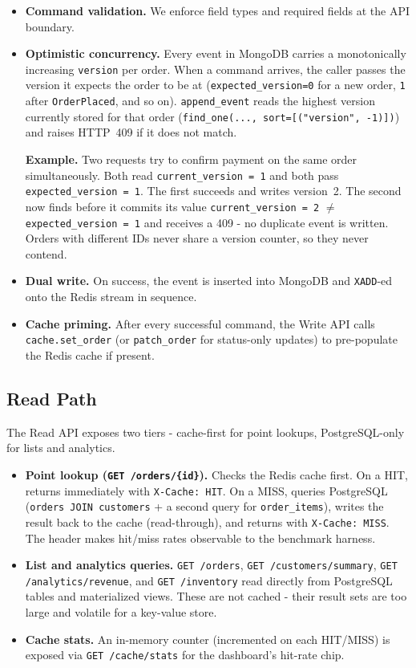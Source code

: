 \documentclass[11pt,a4paper]{article}
\newcommand{\code}[1]{\texttt{\small #1}}
\begin{document}
\begin{itemize}
  \item \textbf{Command validation.} We enforce field types and required fields at the API boundary.
\item \textbf{Optimistic concurrency.}
Every event in MongoDB carries a monotonically increasing \code{version} per order.
When a command arrives, the caller passes the version it expects the order to be at
(\code{expected\_version=0} for a new order, \code{1} after \code{OrderPlaced}, and
so on).
\code{append\_event} reads the highest version currently stored for that order
(\code{find\_one(..., sort=[("version", -1)])}) and raises HTTP~409 if it does not
match.

\textbf{Example.} Two requests try to confirm payment on the same order simultaneously.
Both read \code{current\_version = 1} and both pass \code{expected\_version = 1}.
The first succeeds and writes version~2.
The second now finds before it commits its value \code{current\_version = 2} $\neq$ \code{expected\_version = 1}
and receives a 409 - no duplicate event is written.
Orders with different IDs never share a version counter, so they never contend.

  \item \textbf{Dual write.} On success, the event is inserted into MongoDB and \code{XADD}-ed onto the Redis stream in sequence.
  \item \textbf{Cache priming.} After every successful command, the Write API calls \code{cache.set\_order} (or \code{patch\_order} for status-only updates) to pre-populate the Redis cache if present.
\end{itemize}

\subsection{Read Path}

The Read API exposes two tiers - cache-first for point lookups, PostgreSQL-only for lists and analytics.

\begin{itemize}
  \item \textbf{Point lookup (\code{GET /orders/\{id\}}).} Checks the Redis cache first. On a HIT, returns immediately with \code{X-Cache: HIT}. On a MISS, queries PostgreSQL (\code{orders JOIN customers} + a second query for \code{order\_items}), writes the result back to the cache (read-through), and returns with \code{X-Cache: MISS}. The header makes hit/miss rates observable to the benchmark harness.
  \item \textbf{List and analytics queries.} \code{GET /orders}, \code{GET /customers/summary}, \code{GET /analytics/revenue}, and \code{GET /inventory} read directly from PostgreSQL tables and materialized views. These are not cached - their result sets are too large and volatile for a key-value store.
  \item \textbf{Cache stats.} An in-memory counter (incremented on each HIT/MISS) is exposed via \code{GET /cache/stats} for the dashboard's hit-rate chip.
\end{itemize}
\end{document}

